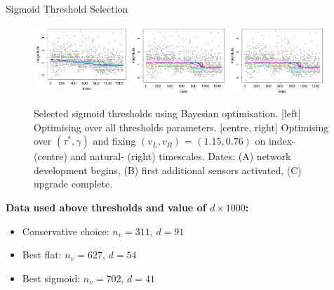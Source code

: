 \begin{frame}{Sigmoid Threshold Selection}
\begin{figure}
    \centering
    \includegraphics[width = 0.32\textwidth]{images/groningen_application/sigmoid_threshold_selection/BO_selected_thresholds.pdf} 
    \includegraphics[width = 0.32\textwidth]{images/groningen_application/sigmoid_threshold_selection/BO_selected_thresholds_restricted.pdf}
    \includegraphics[width = 0.32\textwidth, page = 2]{images/groningen_application/sigmoid_threshold_selection/BO_selected_thresholds_restricted.pdf}
    \caption{ Selected sigmoid thresholds using Bayesian optimisation. [left] Optimising over all thresholds parameters. [centre, right] Optimising over $(\tau^*, \gamma)$ and fixing $(v_{L}, v_{R})$ = $(1.15,0.76)$ on index- (centre) and natural- (right) timescales. Dates: 
     (A) network development begins, (B) first additional sensors activated, (C) upgrade complete.}
    \label{fig:groningen_selected_sigmoid_thresholds}
\end{figure}
\vspace{-1em}
\textbf{Data used above thresholds and value of $d\times 1000$:}
\begin{itemize}
\item Conservative choice:  $n_v=311$, $d= 91$
\item Best flat: $n_v=627$, $d=54$
\item Best sigmoid: $n_v=702$, $d=41$
\end{itemize}
\end{frame}



